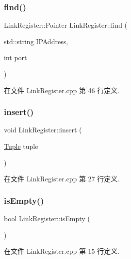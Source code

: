 \subsubsection{\texorpdfstring{find()}{find()}}
{\footnotesize\ttfamily Link\+Register\+::\+Pointer Link\+Register\+::find (\begin{DoxyParamCaption}\item[{std\+::string}]{I\+P\+Address,  }\item[{int}]{port }\end{DoxyParamCaption})}



在文件 Link\+Register.\+cpp 第 46 行定义.

\mbox{\label{class_link_register_a937e313ea63312bd9636c978554e180c}} 
\subsubsection{\texorpdfstring{insert()}{insert()}}
{\footnotesize\ttfamily void Link\+Register\+::insert (\begin{DoxyParamCaption}\item[{\hyperlink{class_tuple}{Tuple}}]{tuple }\end{DoxyParamCaption})}



在文件 Link\+Register.\+cpp 第 27 行定义.

\mbox{\label{class_link_register_a5770b48622c38dadecca356406b6ed47}} 
\subsubsection{\texorpdfstring{is\+Empty()}{isEmpty()}}
{\footnotesize\ttfamily bool Link\+Register\+::is\+Empty (\begin{DoxyParamCaption}{ }\end{DoxyParamCaption})}



在文件 Link\+Register.\+cpp 第 15 行定义.

\mbox{\label{class_link_register_a43763a33de2304f53bfd11e7d3e90491}} 
